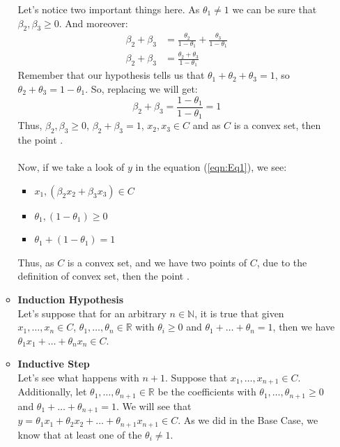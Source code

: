 \documentclass[12pt, oneside]{article}%
\def\N{{\mathbb N}}
\def\R{{\mathbb R}}
\begin{document}
\begin{enumerate}[font=\bfseries]
\begin{itemize}
    Let's notice two important things here. As $\theta_1\neq1$ we can be sure that $\beta_2,\beta_3\geq0$. And moreover:
    \begin{align*}
        \beta_2 + \beta_3 &= \frac{\theta_2}{1-\theta_1} + \frac{\theta_3}{1-\theta_1}\\[0.2cm]
        \beta_2 + \beta_3 &= \frac{\theta_2+\theta_3}{1-\theta_1}
    \end{align*}
    Remember that our hypothesis tells us that $\theta_1+\theta_2 + \theta_3=1$, so $\theta_2 + \theta_3=1-\theta_1$. So, replacing we will get:
    $$\beta_2 + \beta_3 = \frac{1-\theta_1}{1-\theta_1}=1$$
    Thus, $\beta_2,\beta_3\geq0$, $\beta_2 + \beta_3 = 1$, $x_2,x_3\in C$ and as $C$ is a convex set, then the point .\\\\
    Now, if we take a look of $y$ in the equation (\ref{eqn:Eq1}), we see:
    \begin{itemize}
        \item $x_1,(\beta_2x_2+\beta_3x_3)\in C$
        \item $\theta_1, (1-\theta_1)\geq0$
        \item $\theta_1 + (1-\theta_1)=1$
    \end{itemize} 
    Thus, as $C$ is a convex set,  and we have two points of $C$, due to the definition of convex set, then the point .\\
    \item \textbf{Induction Hypothesis}\\
    Let's suppose that for an arbitrary $n\in \N$, it is true that given $x_1, \dots , x_n\in C$, $\theta_1, \dots , \theta_n\in \R$ with $\theta_i \geq 0$ and $\theta_1 + \dots + \theta_n = 1$, then we have $\theta_1x_1 + \dots + \theta_nx_n\in C$.\\
    \item \textbf{Inductive Step}\\
    Let's see what happens with $n+1$. Suppose that $x_1, \dots , x_{n+1}\in C$. Additionally, let $\theta_1, \dots , \theta_{n+1}\in \R$ be the coefficients with $\theta_1, \dots , \theta_{n+1} \geq 0$ and $\theta_1 + \dots + \theta_{n+1} = 1$. We will see that $y=\theta_1x_1+ \theta_2x_2+\dots+ \theta_{n+1}x_{n+1}\in C$. As we did in the Base Case, we know that at least one of the $\theta_i\neq 1$.
    
    \newpage
    

\end{itemize}
\end{enumerate}
\end{document}
